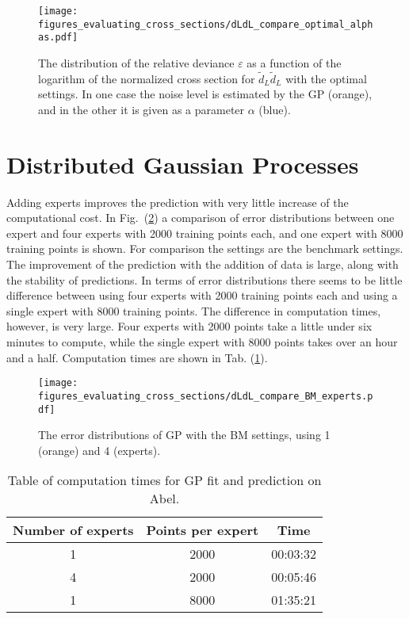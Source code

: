 \documentclass[twoside,english]{uiofysmaster}
\begin{document}
\begin{figure}
\centering
\texttt{[image: figures\_evaluating\_cross\_sections/dLdL\_compare\_optimal\_alphas.pdf]}
\caption{The distribution of the relative deviance $\varepsilon$ as a function of the logarithm of the normalized cross section for $\tilde{d}_L \tilde{d}_L$ with the optimal settings. In one case the noise level is estimated by the GP (orange), and in the other it is given as a parameter $\alpha$ (blue).}
\label{Fig:: evaluating cross : errors distribution alpha vs no alpha optimal}
\end{figure}




\section{Distributed Gaussian Processes}

Adding experts improves the prediction with very little increase of the computational cost. In Fig.\ (\ref{Fig:: evaluating cross : compare 1 vs 4 expert dLdL}) a comparison of error distributions between one expert and four experts with 2000 training points each, and one expert with 8000 training points is shown. For comparison the settings are the benchmark settings. The improvement of the prediction with the addition of data is large, along with the stability of predictions. In terms of error distributions there seems to be little difference between using four experts with 2000 training points each and using a single expert with 8000 training points. The difference in computation times, however, is very large. Four experts with 2000 points take a little under six minutes to compute, while the single expert with 8000 points takes over an hour and a half. Computation times are shown in Tab. (\ref{Tab:: evaluating cross : computation times experts BM}).

\begin{figure}
\centering
\texttt{[image: figures\_evaluating\_cross\_sections/dLdL\_compare\_BM\_experts.pdf]}
\caption{The error distributions of GP with the BM settings, using 1 (orange) and 4 (experts).}
\label{Fig:: evaluating cross : compare 1 vs 4 expert dLdL}
\end{figure}  

\begin{table}
\centering
\begin{tabular}{c|c|c}
Number of experts & Points per expert & Time\\
\hline
1 & 2000 & 00:03:32\\
4 & 2000 & 00:05:46\\
1 & 8000 & 01:35:21
\end{tabular}
\caption{Table of computation times for GP fit and prediction on Abel.}
\label{Tab:: evaluating cross : computation times experts BM}
\end{table}
\end{document}
